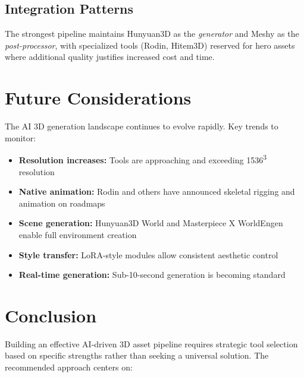 \documentclass[11pt]{article}
\begin{document}
\subsection{Integration Patterns}

\begin{keypoint}
The strongest pipeline maintains Hunyuan3D as the \emph{generator} and Meshy as the \emph{post-processor}, with specialized tools (Rodin, Hitem3D) reserved for hero assets where additional quality justifies increased cost and time.
\end{keypoint}

\section{Future Considerations}

The AI 3D generation landscape continues to evolve rapidly. Key trends to monitor:

\begin{itemize}[leftmargin=2em]
  \item \textbf{Resolution increases:} Tools are approaching and exceeding 1536\textsuperscript{3} resolution
  \item \textbf{Native animation:} Rodin and others have announced skeletal rigging and animation on roadmaps
  \item \textbf{Scene generation:} Hunyuan3D World and Masterpiece X WorldEngen enable full environment creation
  \item \textbf{Style transfer:} LoRA-style modules allow consistent aesthetic control
  \item \textbf{Real-time generation:} Sub-10-second generation is becoming standard
\end{itemize}

\section{Conclusion}

Building an effective AI-driven 3D asset pipeline requires strategic tool selection based on specific strengths rather than seeking a universal solution. The recommended approach centers on:

\begin{center}
\end{center}
\end{document}
